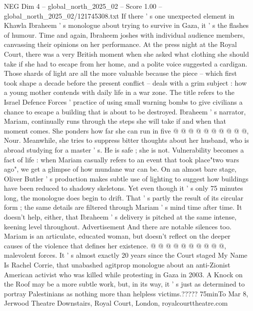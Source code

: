 \begin{textsample}{NEG Dim 4 – global\_north\_2025\_02 – Score 1.00 – global\_north\_2025\_02/121745308.txt}  \label{ex:f4_neg_406}
If there ' s one unexpected element in Khawla Ibraheem ' s monologue about trying to survive in Gaza, it ' s the flashes of humour.
Time and again, Ibraheem joshes with individual audience members, canvassing their opinions on her performance.
At the press night at the Royal Court, there was a very British moment when she asked what clothing she should take if she had to escape from her home, and a polite voice suggested a cardigan.
Those shards of light are all the more valuable because the piece -- which first took shape a decade before the present conflict -- deals with a grim subject : how a young mother contends with daily life in a war zone.
The title refers to the Israel Defence Forces ' practice of using small warning bombs to give civilians a chance to escape a building that is about to be destroyed.
Ibraheem ' s narrator, Mariam, continually runs through the steps she will take if and when that moment comes.
She ponders how far she can run in five @ @ @ @ @ @ @ @ @ @, Nour.
Meanwhile, she tries to suppress bitter thoughts about her husband, who is abroad studying for a master ' s.
He is safe ; she is not.
Vulnerability becomes a fact of life : when Mariam casually refers to an event that took place"two wars ago", we get a glimpse of how mundane war can be.
On an almost bare stage, Oliver Butler ' s production makes subtle use of lighting to suggest how buildings have been reduced to shadowy skeletons.
Yet even though it ' s only 75 minutes long, the monologue does begin to drift.
That ' s partly the result of its circular form ; the same details are filtered through Mariam ' s mind time after time.
It doesn't help, either, that Ibraheem ' s delivery is pitched at the same intense, keening level throughout.
Advertisement And there are notable silences too.
Mariam is an articulate, educated woman, but doesn't reflect on the deeper causes of the violence that defines her existence. @ @ @ @ @ @ @ @ @ @, malevolent forces.
It ' s almost exactly 20 years since the Court staged My Name Is Rachel Corrie, that unabashed agitprop monologue about an anti-Zionist American activist who was killed while protesting in Gaza in 2003.
A Knock on the Roof may be a more subtle work, but, in its way, it ' s just as determined to portray Palestinians as nothing more than helpless victims.????? 75minTo Mar 8, Jerwood Theatre Downstairs, Royal Court, London, royalcourttheatre.com

\end{textsample}
